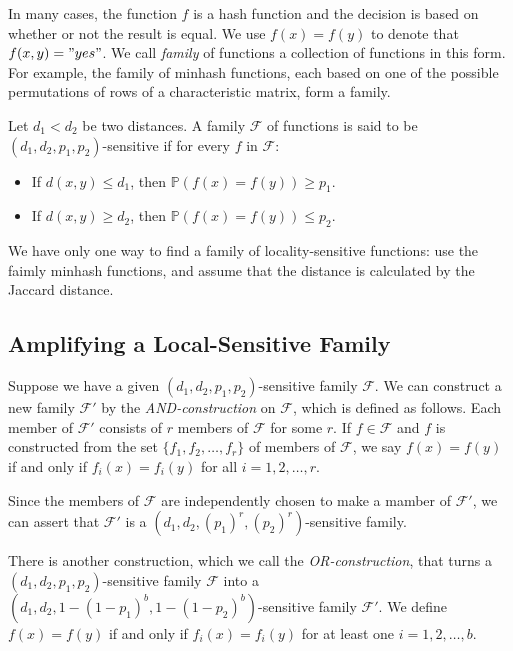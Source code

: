 In many cases, the function $f$ is a hash function and the decision is based on whether or not the result is equal. We use $f(x) = f(y)$ to denote that $f(x, y) = "yes"$. We call \textit{family} of functions a collection of functions in this form. For example, the family of minhash functions, each based on one of the possible permutations of rows of a characteristic matrix, form a family.

Let $d_1 < d_2$ be two distances. A family $\boldsymbol{\mathcal{F}}$ of functions is said to be $(d_1, d_2, p_1, p_2)$-sensitive if for every $f$ in $\boldsymbol{\mathcal{F}}$: 

\begin{itemize}
    \item If $d(x, y) \leq d_1$, then $\mathbb{P}(f(x) = f(y)) \geq p_1$.
    \item If $d(x, y) \geq d_2$, then $\mathbb{P}(f(x) = f(y)) \leq p_2$.
\end{itemize}

We have only one way to find a family of locality-sensitive functions: use the faimly minhash functions, and assume that the distance is calculated by the Jaccard distance. 

\subsection{Amplifying a Local-Sensitive Family}\label{subsec:amplifying-a-local-sensitive-family}

Suppose we have a given $(d_1, d_2, p_1, p_2)$-sensitive family $\boldsymbol{\mathcal{F}}$. We can construct a new family $\boldsymbol{\mathcal{F'}}$ by the \textit{AND-construction} on $\boldsymbol{\mathcal{F}}$, which is defined as follows. Each member of $\boldsymbol{\mathcal{F'}}$ consists of $r$ members of $\boldsymbol{\mathcal{F}}$ for some $r$. If $f \in \boldsymbol{\mathcal{F}}$ and $f$ is constructed from the set $\{f_1, f_2, \dots, f_r\}$ of members of $\boldsymbol{\mathcal{F}}$, we say $f(x) = f(y)$ if and only if $f_i(x) = f_i(y)$ for all $i = 1, 2, \dots, r$.

Since the members of $\boldsymbol{\mathcal{F}}$ are independently chosen to make a mamber of  $\boldsymbol{\mathcal{F'}}$, we can assert that $\boldsymbol{\mathcal{F'}}$ is a $(d_1, d_2, (p_1)^r, (p_2)^r)$-sensitive family.

There is another construction, which we call the \textit{OR-construction}, that turns a $(d_1, d_2, p_1, p_2)$-sensitive family $\boldsymbol{\mathcal{F}}$ into a $(d_1, d_2, 1 - (1 - p_1)^b, 1 - (1 - p_2)^b)$-sensitive family $\boldsymbol{\mathcal{F'}}$. We define $f(x) = f(y)$ if and only if $f_i(x) = f_i(y)$ for at least one $i = 1, 2, \dots, b$.

